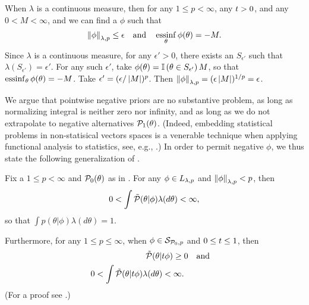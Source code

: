 \begin{ex}
%
When $\lambda$ is a continuous measure, then for any $1 \le p < \infty$, any
$t > 0$, and any $0 < M < \infty$, and we can find a $\phi$ such
that
%
\begin{align*}
%
\norm{\phi}_{\lambda, p} \le \epsilon
\mathand
\essinf_{\theta} \phi(\theta) = -M.
%
\end{align*}
%
Since $\lambda$ is a continuous measure, for any $\epsilon' > 0$, there exists
an $S_{\epsilon'}$ such that $\lambda(S_{\epsilon'}) = \epsilon'$.  For any such
$\epsilon'$, take $\phi(\theta) = \mathbb{I}\left(\theta \in S_{\epsilon'}\right) M$, so that
$\operatorname*{\mathrm{essinf}}_{\theta} \phi(\theta) = -M$. Take $\epsilon' = (\epsilon / \left|M\right|)^p$.
Then $\left\Vert\phi\right\Vert_{\lambda,p} = (\epsilon \left|M\right|)^{1/p} = \epsilon$.
%
\end{ex}

We argue that pointwise negative priors are no substantive problem, as long as
normalizing integral is neither zero nor infinity, and as long as we do not
extrapolate to negative alternatives $\mathcal{P}_{1}(\theta)$.  (Indeed, embedding
statistical problems in non-statisical vectors spaces is a venerable technique
when applying functional analysis to statistics, see, e.g., \citet[Chapter
6]{serfling:2009:approximation}.)  In order to permit negative $\phi$, we thus
state the following generalization of \citep[Result 2]{gustafson:1996:local}.


\begin{lem}
%
Fix a $1 \le p < \infty$ and $\mathcal{P}_{0}(\theta)$ as in .
For any $\phi \in {L_{\lambda,p}}$ and $\left\Vert\phi\right\Vert_{\lambda,p} < p$, then
%
\begin{align*}
%
0 < \int \tilde{\p}(\theta \vert \phi) \lambda(d\theta) < \infty,
%
\end{align*}
%
so that $\int p(\theta \vert \phi) \lambda(d\theta) = 1$.

Furthermore, for any $1 \le p \le \infty$, when $\phi \in \mathcal{S}_{\mathcal{P}_{0},p}$ and $0 \le
t \le 1$, then
%
\begin{align*}
%
\ptil(\theta \vert \t \phi) \ge{}& 0 \mathand\\
0 < \int \ptil(\theta \vert \t \phi) \lambda(d\theta) < \infty.
%
\end{align*}
%
(For a proof see  .)
%
\end{lem}

